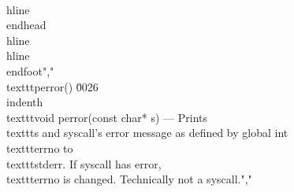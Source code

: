 \\hline\\endhead \\hline\\hline\\endfoot","    \\texttt{perror()} \u0026 \\indenth\\texttt{void perror(const char* s)} --- Prints \\texttt{s} and syscall's error message as defined by global int \\texttt{errno} to \\texttt{stderr}. If syscall has error, \\texttt{errno} is changed. Technically not a syscall.","        %